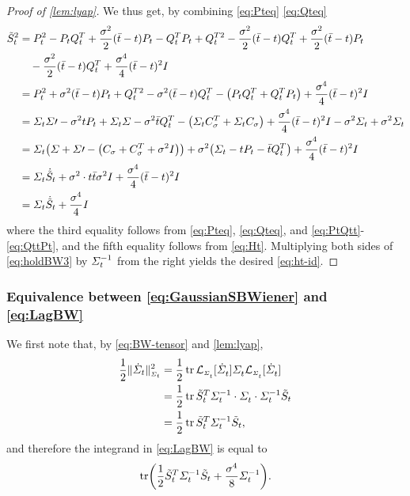 \begin{proof}[Proof of \cref{lem:lyap}]
We thus get, by combining \eqref{eq:Pteq} \eqref{eq:Qteq}
\begin{align}
\nn
\Ht^2 &= \Pt^2 -\Pt \Qt^T  + \frac{\sdev^2}{2}(\ctimebar-\ctime) \Pt -\Qt^T  \Pt + \Qt^{T 2} - \frac{\sdev^2}{2}(\ctimebar-\ctime)\Qt^T  +  \frac{\sdev^2}{2}(\ctimebar-\ctime)\Pt \\
	& \enspace\enspace -  \frac{\sdev^2}{2}(\ctimebar-\ctime)\Qt^T  + \frac{\sdev^4}{4}(\ctimebar-\ctime)^2\eye \\
\nn
&= \Pt^2 + \sdev^2(\ctimebar-\ctime)\Pt + \Qt^{T 2} - \sdev^2(\ctimebar-\ctime)\Qt^T  - \parens*{ \Pt\Qt^T  + \Qt^T  \Pt }  + \frac{\sdev^4}{4}(\ctimebar-\ctime)^2\eye\\
\nn
&= \Sigcurve\Sigma\prime - \sdev^2\ctime\Pt + \Sigcurve \Sigma - \sdev^2 \ctimebar\Qt^T  - \parens*{  \Sigcurve \C^T  + \Sigcurve \C }  + \frac{\sdev^4}{4}(\ctimebar-\ctime)^2\eye - \sdev^2 \Sigcurve + \sdev^2\Sigcurve\\
\nn
&= \Sigcurve\parens*{  \Sigma + \Sigma\prime - \parens*{\C + \C^T  + \sdev^2\eye }} + \sdev^2 \parens*{\Sigcurve -  \ctime\Pt - \ctimebar\Qt^T  }+ \frac{\sdev^4}{4}(\ctimebar-\ctime)^2\eye  \\
\nn 
&= \Sigcurve \dHt + \sdev^2 \cdot\ctime\ctimebar\sdev^2 \eye +  \frac{\sdev^4}{4}(\ctimebar-\ctime)^2\eye \\
\label{eq:holdBW3}
&= \Sigcurve \dHt + \frac{\sdev^4}{4}\eye
\end{align}
where the third equality follows from \eqref{eq:Pteq}, \eqref{eq:Qteq}, and \eqref{eq:PtQtt}-\eqref{eq:QttPt}, and the fifth equality follows from \eqref{eq:Ht}. Multiplying both sides of \eqref{eq:holdBW3} by $\Sigma^{-1}_{t}$ from the right yields the desired \eqref{eq:ht-id}. 
\end{proof}


\subsubsection{Equivalence between \eqref{eq:GaussianSBWiener} and \eqref{eq:LagBW}}

We first note that, by \eqref{eq:BW-tensor} and \cref{lem:lyap},
\begin{align}
\nn
\kenergyBW &= \frac{1}{2}\tr \lyap \Sigmasol \lyap \\
\nn
&= \frac{1}{2}\tr \Ht^T  \Sigmasolinv \cdot \Sigmasol \cdot \Sigmasolinv \Ht \\
&= \frac{1}{2} \tr \Ht^T \Sigmasolinv\Ht,
\end{align}and therefore the integrand in \eqref{eq:LagBW} is equal to
\begin{align}
\label{eq:holdBW2}
\tr \parens*{   \frac{1}{2} \Ht^T \Sigmasolinv\Ht + \frac{\sdev^4}{8} \Sigcurveinv}.
\end{align}


